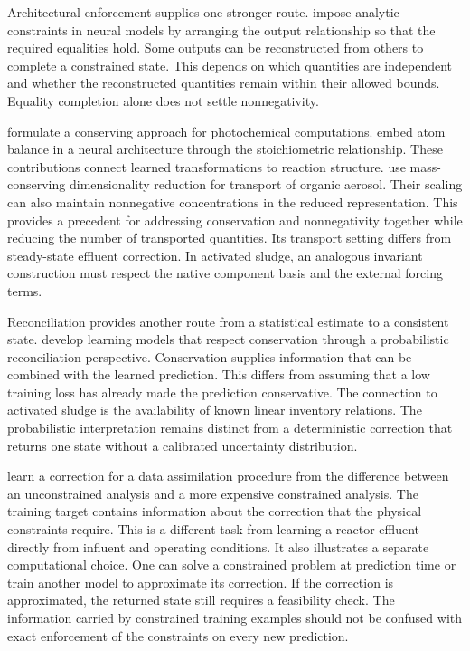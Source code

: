 Architectural enforcement supplies one stronger route. \citet{Beucler2021} impose analytic constraints in neural models by arranging the output relationship so that the required equalities hold. Some outputs can be reconstructed from others to complete a constrained state. This depends on which quantities are independent and whether the reconstructed quantities remain within their allowed bounds. Equality completion alone does not settle nonnegativity.

\citet{SturmWexler2020} formulate a conserving approach for photochemical computations. \citet{SturmWexler2022} embed atom balance in a neural architecture through the stoichiometric relationship. These contributions connect learned transformations to reaction structure. \citet{Sturm2023} use mass-conserving dimensionality reduction for transport of organic aerosol. Their scaling can also maintain nonnegative concentrations in the reduced representation. This provides a precedent for addressing conservation and nonnegativity together while reducing the number of transported quantities. Its transport setting differs from steady-state effluent correction. In activated sludge, an analogous invariant construction must respect the native component basis and the external forcing terms.

Reconciliation provides another route from a statistical estimate to a consistent state. \citet{Hansen2024} develop learning models that respect conservation through a probabilistic reconciliation perspective. Conservation supplies information that can be combined with the learned prediction. This differs from assuming that a low training loss has already made the prediction conservative. The connection to activated sludge is the availability of known linear inventory relations. The probabilistic interpretation remains distinct from a deterministic correction that returns one state without a calibrated uncertainty distribution.

\citet{Ruckstuhl2021} learn a correction for a data assimilation procedure from the difference between an unconstrained analysis and a more expensive constrained analysis. The training target contains information about the correction that the physical constraints require. This is a different task from learning a reactor effluent directly from influent and operating conditions. It also illustrates a separate computational choice. One can solve a constrained problem at prediction time or train another model to approximate its correction. If the correction is approximated, the returned state still requires a feasibility check. The information carried by constrained training examples should not be confused with exact enforcement of the constraints on every new prediction.

